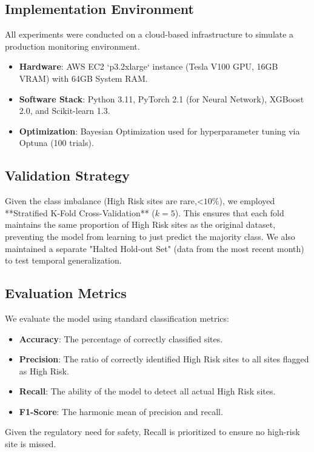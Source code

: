 \documentclass[conference]{IEEEtran}
\begin{document}
\subsection{\textbf{Implementation Environment}}
All experiments were conducted on a cloud-based infrastructure to simulate a production monitoring environment.
\begin{itemize}
    \item \textbf{Hardware}: AWS EC2 `p3.2xlarge` instance (Tesla V100 GPU, 16GB VRAM) with 64GB System RAM.
    \item \textbf{Software Stack}: Python 3.11, PyTorch 2.1 (for Neural Network), XGBoost 2.0, and Scikit-learn 1.3.
    \item \textbf{Optimization}: Bayesian Optimization used for hyperparameter tuning via Optuna (100 trials).
\end{itemize}

\subsection{\textbf{Validation Strategy}}
Given the class imbalance (High Risk sites are rare,<$10\%$), we employed **Stratified K-Fold Cross-Validation** ($k=5$). This ensures that each fold maintains the same proportion of High Risk sites as the original dataset, preventing the model from learning to just predict the majority class. We also maintained a separate "Halted Hold-out Set" (data from the most recent month) to test temporal generalization.

\subsection{\textbf{Evaluation Metrics}}
We evaluate the model using standard classification metrics:
\begin{itemize}
    \item \textbf{Accuracy}: The percentage of correctly classified sites.
    \item \textbf{Precision}: The ratio of correctly identified High Risk sites to all sites flagged as High Risk.
    \item \textbf{Recall}: The ability of the model to detect all actual High Risk sites.
    \item \textbf{F1-Score}: The harmonic mean of precision and recall.
\end{itemize}

Given the regulatory need for safety, Recall is prioritized to ensure no high-risk site is missed.
\end{document}
